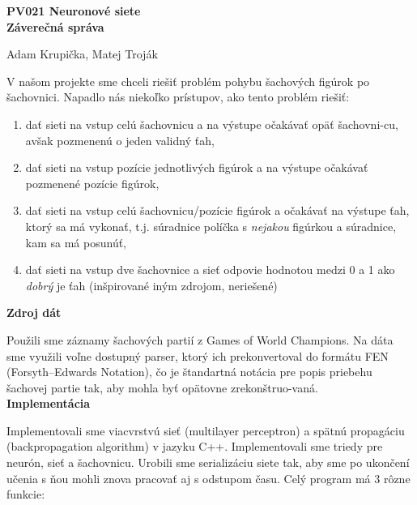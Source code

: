 \documentclass[12pt]{article}
\newcommand{\mysection}[1]{{\newpage\centering\Large\textbf{#1}\\}\normalsize\vspace{0.1cm}}
\newcommand{\mysmallsection}[1]{\vspace{0.5cm}{\centering\large\textbf{#1}\\}\normalsize\vspace{0.5cm}}
\begin{document}
\mysection{PV021 Neuronové siete \\ Záverečná správa}
\begin{center}
Adam Krupička, Matej Troják
\end{center}

\mysmallsection{Problém šachového ťahu}
V našom projekte sme chceli riešiť problém pohybu šachových figúrok po šachovnici. Napadlo nás niekoľko prístupov, ako tento problém riešiť:

\begin{enumerate}
\item dať sieti na vstup celú šachovnicu a na výstupe očakávať opäť šachovni-cu, avšak pozmenenú o jeden validný ťah,
\item dať sieti na vstup pozície jednotlivých figúrok a na výstupe očakávať pozmenené pozície figúrok,
\item dať sieti na vstup celú šachovnicu/pozície figúrok a očakávať na výstupe ťah, ktorý sa má vykonať, t.j. súradnice políčka s \textit{nejakou} figúrkou a súradnice, kam sa má posunúť,
\item dať sieti na vstup dve šachovnice a sieť odpovie hodnotou medzi 0 a 1 ako \textit{dobrý} je ťah (inšpirované iným zdrojom, neriešené)
\end{enumerate}

{\centering\textbf{Zdroj dát}\\}

Použili sme záznamy šachových partií z Games of World Champions\footnotemark[1]. Na dáta sme využili voľne dostupný parser, ktorý ich prekonvertoval do formátu FEN (Forsyth–Edwards Notation), čo je štandartná notácia pre popis priebehu šachovej partie tak, aby mohla byť opätovne zrekonštruo-vaná. \\

{\centering\textbf{Implementácia}\\}

Implementovali sme viacvrstvú sieť (multilayer perceptron) a spätnú propagáciu (backpropagation algorithm) v jazyku C++. Implementovali sme triedy pre neurón, sieť a šachovnicu. Urobili sme serializáciu siete tak, aby sme po ukončení učenia s ňou mohli znova pracovať aj s odstupom času. Celý program má 3 rôzne funkcie:
\end{document}
